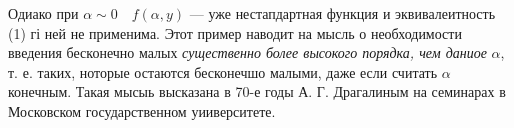 \documentclass[12pt]{article}
\begin{document}
Одиако при $\alpha \sim 0 \quad f(\alpha, y)$ --- уже нестапдартная функция и эквивалеитность (1) гі ней не применима. 
Этот пример наводит на мысль о необходимости введения бесконечно малых \textit{существенно более высокого порядка, чем даниое} $\alpha$, т. е. таких, ноторые остаются бесконечшо малыми, даже если считать $\alpha$ конечным. 
Такая мысыь высказана в 70-е годы А. Г. Драгалиным на семинарах в Московском государственном уииверситете. 
\end{document}

